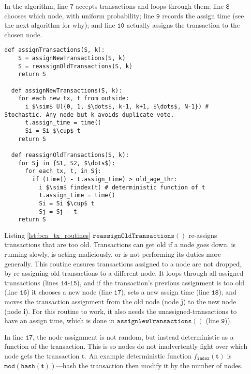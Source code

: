 In the algorithm, line $\mathtt{7}$ accepts transactions and loops through them; line $\mathtt{8}$ chooses which node, with uniform probability; line $\mathtt{9}$ records the assign time (see the next algorithm for why); and line $\mathtt{10}$ actually assigns the transaction to the chosen node.

\begin{minipage}{\linewidth}
  \begin{lstlisting}[caption={Routines for accepting and assigning transactions.}, label={lst:bca_tx_routines}, style=python, mathescape=true]
  def assignTransactions(S, k):
    S = assignNewTransactions(S, k) 
    S = reassignOldTransactions(S, k) 
    return S 
    
  def assignNewTransactions(S, k): 
    for each new tx, t from outside: 
      i $\sim$ U({0, 1, $\dots$, k-1, k+1, $\dots$, N-1}) # Stochastic. Any node but k avoids duplicate vote. 
      t.assign_time = time() 
      Si = Si $\cup$ t 
    return S 
    
  def reassignOldTransactions(S, k): 
    for Sj in {S1, S2, $\dots$}: 
      for each tx, t, in Sj: 
        if (time() - t.assign_time) > old_age_thr:
          i $\sim$ findex(t) # deterministic function of t
          t.assign_time = time()
          Si = Si $\cup$ t
          Sj = Sj - t
    return S
  \end{lstlisting}
\end{minipage}

Listing \ref{lst:bca_tx_routines} $\mathtt{reassignOldTransactions()}$ re-assigns transactions that are too old.
Transactions can get old if a node goes down, is running slowly, is acting maliciously, or is not performing its duties more generally.
This routine ensures transactions assigned to a node are not dropped, by re-assigning old transactions to a different node.
It loops through all assigned transactions (lines $\mathtt{14}$-$\mathtt{15}$), and if the transaction’s previous assignment is too old (line $\mathtt{16}$) it chooses a new node (line $\mathtt{17}$), sets a new assign time (line $\mathtt{18}$), and moves the transaction assignment from the old node (node \textbf{j}) to the new node (node \textbf{i}).
For this routine to work, it also needs the unassigned-transactions to have an assign time, which is done in $\mathtt{assignNewTransactions()}$ (line $\mathtt{9}$)).

In line $\mathtt{17}$, the node assignment is not random, but instead deterministic as a function of the transaction.
This is so nodes do not inadvertently fight over which node gets the transaction $\mathbf{t}$.
An example deterministic function $f_{\mathtt{index}}(\mathbf{t})$ is $\mathtt{mod}(\mathtt{hash}(\mathbf{t}))$—hash the transaction then modify it by the number of nodes.

